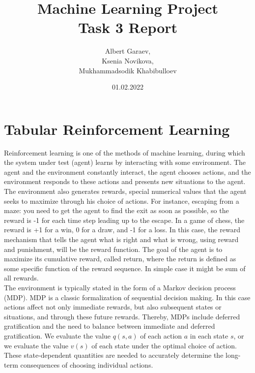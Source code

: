 \documentclass[a4paper, twoside, english]{article}
\title{Machine Learning Project\\Task 3 Report}
\author{Albert Garaev,\\ Ksenia Novikova,\\ Mukhammadsodik Khabibulloev }
\date{01.02.2022}
\begin{document}
\maketitle

\section{Tabular Reinforcement Learning}

Reinforcement learning is one of the methods of machine learning, during which the system under test (agent) learns by interacting with some environment. The agent and the environment constantly interact, the agent chooses actions, and the environment responds to these actions and presents new situations to the agent. The environment also generates rewards, special numerical values that the agent seeks to maximize through his choice of actions. For instance, escaping from a maze: you need to get the agent to find the exit as soon as possible, so the reward is -1 for each time step leading up to the escape. In a game of chess, the reward is +1 for a win, 0 for a draw, and -1 for a loss. In this case, the reward mechanism that tells the agent what is right and what is wrong, using reward and punishment, will be the reward function. The goal of the agent is to maximize its cumulative reward, called return, where the return is defined as some specific function of the reward sequence. In simple case it might be sum of all rewards. \\


The environment is typically stated in the form of a Markov decision process (MDP). MDP is a classic formalization of sequential decision making. In this case actions affect not only immediate rewards, but also subsequent states or situations, and through these future rewards. Thereby, MDPs include deferred gratification and the need to balance between immediate and deferred gratification. We evaluate the value $q(s, a)$ of each action $a$ in each state $s$, or we evaluate the value $v(s)$ of each state under the optimal choice of action. These state-dependent quantities are needed to accurately determine the long-term consequences of choosing individual actions. ~\cite{MPD}\\
\end{document}
